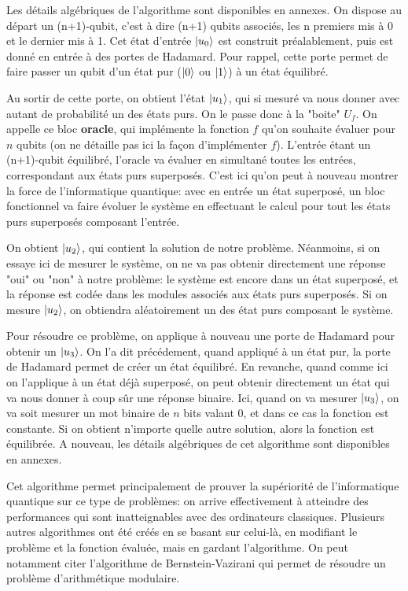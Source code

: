 Les détails algébriques de l'algorithme sont disponibles en annexes.
\medbreak
On dispose au départ un (n+1)-qubit, c'est à dire (n+1) qubits associés, les n premiers mis à 0 et le dernier mis à 1. Cet état d'entrée $\ket{u_0}$ est construit préalablement, puis est donné en entrée à des portes de Hadamard. Pour rappel, cette porte permet de faire passer un qubit d'un état pur ($\ket{0}$ ou $\ket{1}$) à un état équilibré. 

Au sortir de cette porte, on obtient l'état $\ket{u_1}$, qui si mesuré va nous donner avec autant de probabilité un des états purs. On le passe donc à la "boite" $U_f$. On appelle ce bloc \textbf{oracle}, qui implémente la fonction $f$ qu'on souhaite évaluer pour $n$ qubits (on ne détaille pas ici la façon d'implémenter $f$). L'entrée étant un (n+1)-qubit équilibré, l'oracle va évaluer en simultané toutes les entrées, correspondant aux états purs superposés. C'est ici qu'on peut à nouveau montrer la force de l'informatique quantique: avec en entrée un état superposé, un bloc fonctionnel va faire évoluer le système en effectuant le calcul pour tout les états purs superposés composant l'entrée.

On obtient $\ket{u_2}$, qui contient la solution de notre problème. Néanmoins, si on essaye ici de mesurer le système, on ne va pas obtenir directement une réponse "oui" ou "non" à notre problème: le système est encore dans un état superposé, et la réponse est codée dans les modules associés aux états purs superposés. Si on mesure $\ket{u_2}$, on obtiendra aléatoirement un des état purs composant le système.

Pour résoudre ce problème, on applique à nouveau une porte de Hadamard pour obtenir un $\ket{u_3}$. On l'a dit précédement, quand appliqué à un état pur, la porte de Hadamard permet de créer un état équilibré. En revanche, quand comme ici on l'applique à un état déjà superposé, on peut obtenir directement un état qui va nous donner à coup sûr une réponse binaire. Ici, quand on va mesurer $\ket{u_3}$, on va soit mesurer un mot binaire de $n$ bits valant 0, et dans ce cas la fonction est constante. Si on obtient n'importe quelle autre solution, alors la fonction est équilibrée. A nouveau, les détails algébriques de cet algorithme sont disponibles en annexes.

\medbreak

Cet algorithme permet principalement de prouver la supériorité de l'informatique quantique sur ce type de problèmes: on arrive effectivement à atteindre des performances qui sont inatteignables avec des ordinateurs classiques. Plusieurs autres algorithmes ont été créés en se basant sur celui-là, en modifiant le problème et la fonction évaluée, mais en gardant l'algorithme. On peut notamment citer l'algorithme de Bernstein-Vazirani \cite{Bernstein97} qui permet de résoudre un problème d'arithmétique modulaire.

